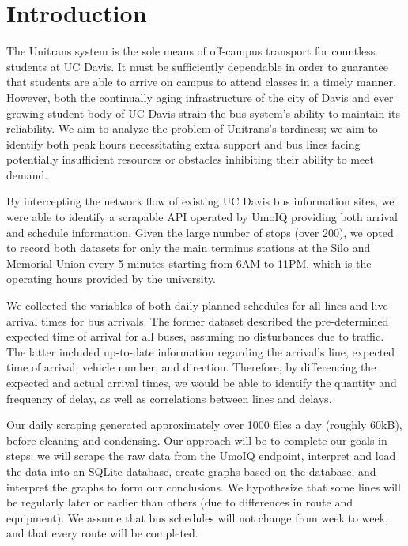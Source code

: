 \documentclass[]{article}
\begin{document}
	\section{Introduction}
	The Unitrans system is the sole means of off-campus transport for countless students at UC Davis. It must be sufficiently dependable in order to guarantee that students are able to arrive on campus to attend classes in a timely manner. However, both the continually aging infrastructure of the city of Davis and ever growing student body of UC Davis strain the bus system's ability to maintain its reliability. We aim to analyze the problem of Unitrans's tardiness; we aim to identify both peak hours necessitating extra support and bus lines facing potentially insufficient resources or obstacles inhibiting their ability to meet demand.
	
	By intercepting the network flow of existing UC Davis bus information sites, we were able to identify a scrapable API operated by UmoIQ providing both arrival and schedule information. Given the large number of stops (over 200), we opted to record both datasets for only the main terminus stations at the Silo and Memorial Union every 5 minutes starting from 6AM to 11PM, which is the operating hours provided by the university.
	
	We collected the variables of both daily planned schedules for all lines and live arrival times for bus arrivals. The former dataset described the pre-determined expected time of arrival for all buses, assuming no disturbances due to traffic. The latter included up-to-date information regarding the arrival's line, expected time of arrival, vehicle number, and direction. Therefore, by differencing the expected and actual arrival times, we would be able to identify the quantity and frequency of delay, as well as correlations between lines and delays.
	
	Our daily scraping generated approximately over 1000 files a day (roughly 60kB), before cleaning and condensing.
	Our approach will be to complete our goals in steps: we will scrape the raw data from the UmoIQ endpoint, interpret and load the data into an SQLite database, create graphs based on the database, and interpret the graphs to form our conclusions. We hypothesize that some lines will be regularly later or earlier than others (due to differences in route and equipment). We assume that bus schedules will not change from week to week, and that every route will be completed. 
\end{document}
